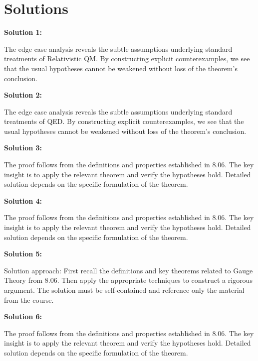 \documentclass[12pt,a4paper]{exam}
\begin{document}
\newpage
\section*{Solutions}

\textbf{Solution 1:}

The edge case analysis reveals the subtle assumptions underlying standard treatments of Relativistic QM. By constructing explicit counterexamples, we see that the usual hypotheses cannot be weakened without loss of the theorem's conclusion.

\vspace{0.5cm}

\textbf{Solution 2:}

The edge case analysis reveals the subtle assumptions underlying standard treatments of QED. By constructing explicit counterexamples, we see that the usual hypotheses cannot be weakened without loss of the theorem's conclusion.

\vspace{0.5cm}

\textbf{Solution 3:}

The proof follows from the definitions and properties established in 8.06. The key insight is to apply the relevant theorem and verify the hypotheses hold. Detailed solution depends on the specific formulation of the theorem.

\vspace{0.5cm}

\textbf{Solution 4:}

The proof follows from the definitions and properties established in 8.06. The key insight is to apply the relevant theorem and verify the hypotheses hold. Detailed solution depends on the specific formulation of the theorem.

\vspace{0.5cm}

\textbf{Solution 5:}

Solution approach: First recall the definitions and key theorems related to Gauge Theory from 8.06. Then apply the appropriate techniques to construct a rigorous argument. The solution must be self-contained and reference only the material from the course.

\vspace{0.5cm}

\textbf{Solution 6:}

The proof follows from the definitions and properties established in 8.06. The key insight is to apply the relevant theorem and verify the hypotheses hold. Detailed solution depends on the specific formulation of the theorem.
\end{document}
